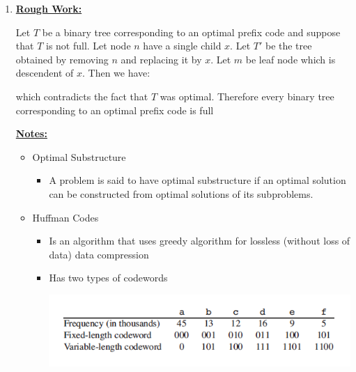 \documentclass[12pt]{article}
\begin{document}
\begin{enumerate}[1.]
    \item

    \bigskip

    \begin{mdframed}
        \underline{\textbf{Rough Work:}}

        \bigskip

        Let $T$ be a binary tree corresponding to an optimal prefix code and suppose
        that $T$ is not full. Let node $n$ have a single child $x$. Let $T'$ be the
        tree obtained by removing $n$ and replacing it by $x$. Let $m$ be leaf node
        which is descendent of $x$. Then we have:


        \begin{mdframed}

        \end{mdframed}

        which contradicts the fact that $T$ was optimal. Therefore every binary tree
        corresponding to an optimal prefix code is full

    \end{mdframed}

    \underline{\textbf{Notes:}}

    \bigskip

    \begin{itemize}
        \item Optimal Substructure

        \begin{itemize}
            \item A problem is said to have optimal substructure if an optimal solution
            can be constructed from optimal solutions of its subproblems.
        \end{itemize}

        \item Huffman Codes

        \begin{itemize}
            \item Is an algorithm that uses greedy algorithm for lossless (without loss of data) data compression
            \item Has two types of codewords

            \begin{center}
            \includegraphics[width=\linewidth]{images/worksheet_2_solution_11.png}
            \end{center}


\end{itemize}
\end{itemize}
\end{enumerate}
\end{document}
